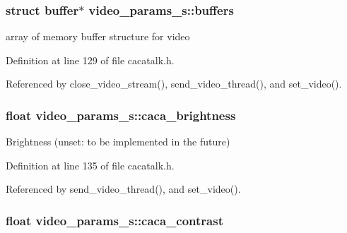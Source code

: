 \hypertarget{structvideo__params__s_af22e9e81ce6b788b4357d70f43dc1260}{
\subsubsection[{buffers}]{\setlength{\rightskip}{0pt plus 5cm}struct {\bf buffer}$\ast$ {\bf video\-\_\-params\-\_\-s\-::buffers}}}\label{structvideo__params__s_af22e9e81ce6b788b4357d70f43dc1260}


array of memory buffer structure for video 



\-Definition at line 129 of file cacatalk.\-h.



\-Referenced by close\-\_\-video\-\_\-stream(), send\-\_\-video\-\_\-thread(), and set\-\_\-video().

\hypertarget{structvideo__params__s_ab2e01e01864e7fb07fdc3ec727edf8ab}{
\subsubsection[{caca\-\_\-brightness}]{\setlength{\rightskip}{0pt plus 5cm}float {\bf video\-\_\-params\-\_\-s\-::caca\-\_\-brightness}}}\label{structvideo__params__s_ab2e01e01864e7fb07fdc3ec727edf8ab}


\-Brightness (unset\-: to be implemented in the future) 



\-Definition at line 135 of file cacatalk.\-h.



\-Referenced by send\-\_\-video\-\_\-thread(), and set\-\_\-video().

\hypertarget{structvideo__params__s_aa080edd1e1614a24f4496118ae33bfbc}{
\subsubsection[{caca\-\_\-contrast}]{\setlength{\rightskip}{0pt plus 5cm}float {\bf video\-\_\-params\-\_\-s\-::caca\-\_\-contrast}}}\label{structvideo__params__s_aa080edd1e1614a24f4496118ae33bfbc}


